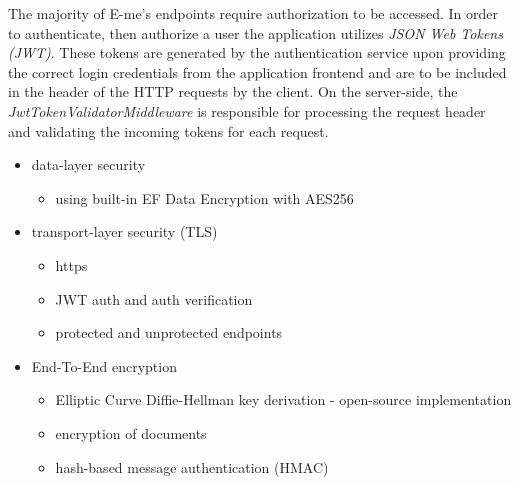 The majority of E-me's endpoints require authorization to be accessed.
In order to authenticate, then authorize a user the application utilizes \emph{JSON Web Tokens (JWT)}.
These tokens are generated by the authentication service upon providing the correct login credentials from the application frontend and are to be
included in the header of the HTTP requests by the client.
On the server-side, the \emph{JwtTokenValidatorMiddleware} is responsible for processing the request header and validating the incoming tokens for each request.


\begin{itemize}
	\item data-layer security
	\begin{itemize}
		\item using built-in EF Data Encryption with AES256
	\end{itemize}
	\item transport-layer security (TLS)
	\begin{itemize}
		\item https
		\item JWT auth and auth verification
		\item protected and unprotected endpoints
	\end{itemize}
	\item End-To-End encryption
	\begin{itemize}
		\item Elliptic Curve Diffie-Hellman key derivation - open-source implementation
		\item encryption of documents
		\item hash-based message authentication (HMAC)
	\end{itemize}
\end{itemize}